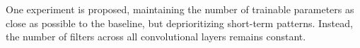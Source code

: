 
One experiment is proposed, maintaining the number of
trainable parameters as close as possible to the baseline,
but deprioritizing short-term patterns. Instead, the number
of filters across all convolutional layers remains constant.

